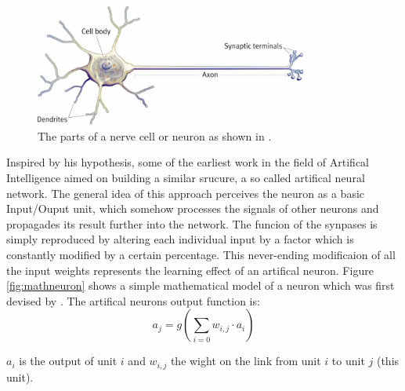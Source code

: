 \documentclass[10pt,a4paper,DIV=11]{scrreprt}
\begin{document}
\begin{center}
\begin{figure}
\includegraphics[width=0.8\textwidth,scale=1]{files/neuron.jpg}  
\caption{The parts of a nerve cell or neuron as shown in \cite{NEU}.}
\label{fig:neuron}
\end{figure}
\end{center}


Inspired by his hypothesis, some of the earliest work in the field of Artifical Intelligence aimed on building a similar srucure, a so called artifical neural network. The general idea of this approach perceives the neuron as a basic Input/Ouput unit, which somehow processes the signals of other neurons and propagades its result further into the network. The funcion of the synpases is simply reproduced by altering each individual input by a  factor which is constantly modified by a certain percentage. This never-ending modificaion of all the input weights represents the learning effect of an artifical neuron. Figure \ref{fig:mathneuron} shows a simple mathematical model of a neuron which was first devised by \cite{NEURONMATH}. The artifical neurons output function is:\\

\begin{equation}
a_j = g(\sum_{i=0}^{} w_{i,j} \cdot a_{i})
\end{equation}

$a_{i}$ is the output of unit ${i}$ and $w_{i,j}$ the wight on the link from unit $i$ to unit $j$ (this unit). 
\end{document}
